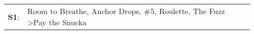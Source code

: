 \begin{supertabular}{p{0.03\textwidth}p{0.92\textwidth}}
 \textbf{S1}:  &  Room to Breathe\textsuperscript{}, \enspace Anchor Drops\textsuperscript{}, \enspace \#5\textsuperscript{}, \enspace Roulette\textsuperscript{}, \enspace The Fuzz\textsuperscript{} \textgreater \enspace Pay the Snucka\textsuperscript{}  \enspace  \\
\end{supertabular}
